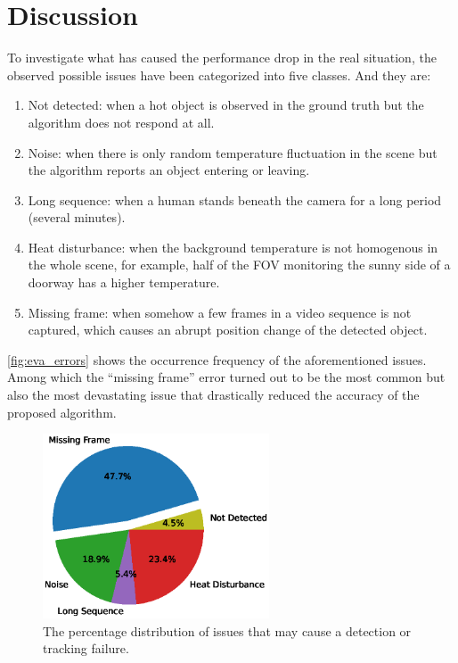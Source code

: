 \section{Discussion}
To investigate what has caused the performance drop in the real situation, the observed possible issues have been categorized into five classes. And they are:
\begin{enumerate}
  \item Not detected: when a hot object is observed in the ground truth but the algorithm does not respond at all.
  \item Noise: when there is only random temperature fluctuation in the scene but the algorithm reports an object entering or leaving.
  \item Long sequence: when a human stands beneath the camera for a long period (several minutes).
  \item Heat disturbance: when the background temperature is not homogenous in the whole scene, for example, half of the FOV monitoring the sunny side of a doorway has a higher temperature.
  \item Missing frame: when somehow a few frames in a video sequence is not captured, which causes an abrupt position change of the detected object.
\end{enumerate}
\autoref{fig:eva_errors} shows the occurrence frequency of the aforementioned issues. Among which the ``missing frame'' error turned out to be the most common but also the most devastating issue that drastically reduced the accuracy of the proposed algorithm.
\begin{figure}
  \centering
  \includegraphics[width=0.6\textwidth]{figures/errors.eps}
  \caption{The percentage distribution of issues that may cause a detection or tracking failure.}\label{fig:eva_errors}
\end{figure}


